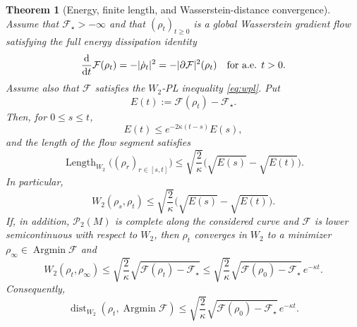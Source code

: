 \documentclass[11pt]{article}
\newtheorem{theorem}{Theorem}[section]
\theoremstyle{definition}
\newcommand{\Ptwo}{\mathcal P_2}
\newcommand{\F}{\mathcal F}
\newcommand{\W}{W_2}
\newcommand{\distW}{\operatorname{dist}_{\W}}
\begin{document}
\begin{theorem}[Energy, finite length, and Wasserstein-distance convergence]\label{thm:wpl-flow-convergence}
Assume that $\F_\star> -\infty$ and that $(\rho_t)_{t\ge0}$ is a global Wasserstein gradient flow satisfying the full energy dissipation identity
\begin{equation}
        \frac{{\rm d}}{{\rm d}t}\F(\rho_t)
        =-|\dot\rho_t|^2
        =-|\partial\F|^2(\rho_t)
        \quad\text{for a.e. }t>0.
        \label{eq:full-ede}
\end{equation}
Assume also that $\F$ satisfies the $\W$-PL inequality \eqref{eq:wpl}. Put
\[
        E(t):=\F(\rho_t)-\F_\star.
\]
Then, for $0\le s\le t$,
\begin{equation}
        E(t)
        \le e^{-2\kappa(t-s)}E(s),
        \label{eq:energy-rate-from-s}
\end{equation}
and the length of the flow segment satisfies
\begin{equation}
        \operatorname{Length}_{\W}\bigl((\rho_r)_{r\in[s,t]}\bigr)
        \le
        \sqrt{\frac{2}{\kappa}}\bigl(\sqrt{E(s)}-\sqrt{E(t)}\bigr).
        \label{eq:length-bound-finite-time}
\end{equation}
In particular,
\begin{equation}
        \W(\rho_s,\rho_t)
        \le
        \sqrt{\frac{2}{\kappa}}\bigl(\sqrt{E(s)}-\sqrt{E(t)}\bigr).
        \label{eq:w-between-times}
\end{equation}
If, in addition, $\Ptwo(M)$ is complete along the considered curve and $\F$ is lower semicontinuous with respect to $\W$, then $\rho_t$ converges in $\W$ to a minimizer $\rho_\infty\in\operatorname{Argmin}\F$ and
\begin{equation}
        \W(\rho_t,\rho_\infty)
        \le
        \sqrt{\frac{2}{\kappa}}\sqrt{\F(\rho_t)-\F_\star}
        \le
        \sqrt{\frac{2}{\kappa}}\sqrt{\F(\rho_0)-\F_\star}\,e^{-\kappa t}.
        \label{eq:w-to-limit-rate}
\end{equation}
Consequently,
\begin{equation}
        \distW(\rho_t,\operatorname{Argmin}\F)
        \le
        \sqrt{\frac{2}{\kappa}}\sqrt{\F(\rho_0)-\F_\star}\,e^{-\kappa t}.
        \label{eq:w-to-argmin-rate}
\end{equation}
\end{theorem}
\end{document}
